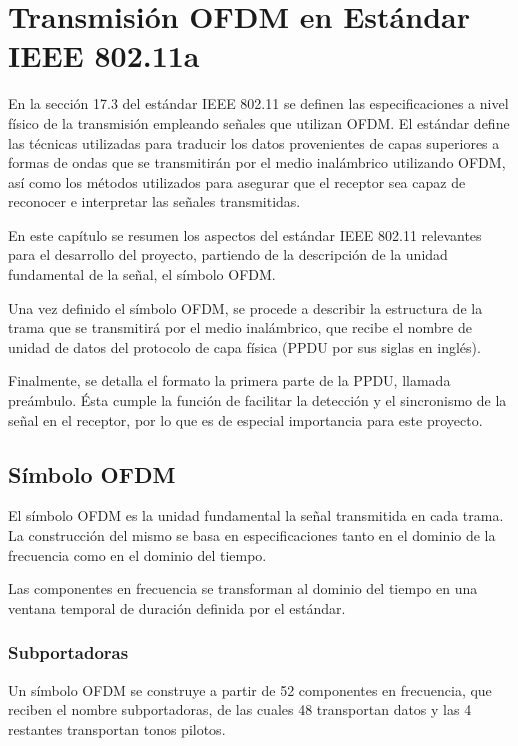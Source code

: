 \chapter{Transmisión OFDM en Estándar IEEE 802.11a}
\label{Ch:2}
\graphicspath{{figs/}}

En la sección 17.3 del estándar IEEE 802.11\cite{ieee} se definen las especificaciones a nivel físico de la transmisión empleando señales que utilizan OFDM. El estándar define las técnicas utilizadas para traducir los datos provenientes de capas superiores a formas de ondas que se transmitirán por el medio inalámbrico utilizando OFDM, así como los métodos utilizados para asegurar que el receptor sea capaz de reconocer e interpretar las señales transmitidas.

En este capítulo se resumen los aspectos del estándar IEEE 802.11 relevantes para el desarrollo del proyecto, partiendo de la descripción de la unidad fundamental de la señal, el símbolo OFDM.

Una vez definido el símbolo OFDM, se procede a describir la estructura de la trama que se transmitirá por el medio inalámbrico, que recibe el nombre de unidad de datos del protocolo de capa física (PPDU por sus siglas en inglés).

Finalmente, se detalla el formato la primera parte de la PPDU, llamada preámbulo. Ésta cumple la función de facilitar la detección y el sincronismo de la señal en el receptor, por lo que es de especial importancia para este proyecto.

\section{Símbolo OFDM}
\label{S:ch2-simbolo}

El símbolo OFDM es la unidad fundamental la señal transmitida en cada trama. La construcción del mismo se basa en especificaciones tanto en el dominio de la frecuencia como en el dominio del tiempo.

Las componentes en frecuencia se transforman al dominio del tiempo en una ventana temporal de duración definida por el estándar. 

\subsection{Subportadoras}
\label{Ss:ch2-subportadoras}

Un símbolo OFDM se construye a partir de 52 componentes en frecuencia, que reciben el nombre subportadoras, de las cuales 48 transportan datos y las 4 restantes transportan tonos pilotos. 

